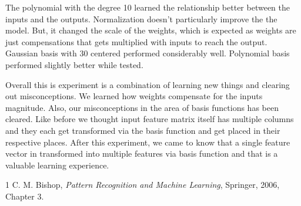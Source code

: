 \documentclass[12pt]{article}
\begin{document}
The polynomial with the degree 10 learned the relationship better between the inputs and the outputs. Normalization doesn't particularly improve the the model. But, it changed the scale of the weights, which is expected as weights are just compensations that gets multiplied with inputs to reach the output. Gaussian basis with 30 centered performed considerably well. Polynomial basis performed slightly better while tested.

Overall this is experiment is a combination of learning new things and clearing out misconceptions. We learned how weights compensate for the inputs magnitude. Also, our misconceptions in the area of basis functions has been cleared. Like before we thought input feature matrix itself has multiple columns and they each get transformed via the basis function and get placed in their respective places. After this experiment, we came to know that a single feature vector in transformed into multiple features via basis function and that is a valuable learning experience.

\begin{thebibliography}{1}
C. M. Bishop, \textit{Pattern Recognition and Machine Learning}, Springer, 2006, Chapter 3.
\end{thebibliography}
\end{document}
